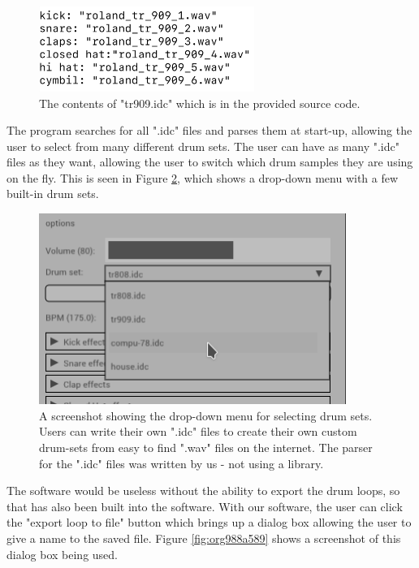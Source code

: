 \documentclass[11pt]{article}
\begin{document}
\begin{figure}[H]
\centering
\includegraphics[width=7cm]{./config.png}
\caption{\label{fig:orgbb8b843}
The contents of "tr909.idc" which is in the provided source code.}
\end{figure}

The program searches for all ".idc" files and parses them at start-up,
allowing the user to select from many different drum sets. The user
can have as many ".idc" files as they want, allowing the user to
switch which drum samples they are using on the fly. This is seen in
Figure \ref{fig:org00ba6c3}, which shows a drop-down menu with a few built-in
drum sets.

\begin{figure}[htbp]
\centering
\includegraphics[width=10cm]{./drum_sets.png}
\caption{\label{fig:org00ba6c3}
A screenshot showing the drop-down menu for selecting drum sets. Users can write their own ".idc" files to create their own custom drum-sets from easy to find ".wav" files on the internet. The parser for the ".idc" files was written by us - not using a library.}
\end{figure}

The software would be useless without the ability to export the drum
loops, so that has also been built into the software. With our software,
the user can click the "export loop to file" button which brings up a dialog
box allowing the user to give a name to the saved file. Figure \ref{fig:org988a589} shows
a screenshot of this dialog box being used.
\end{document}
